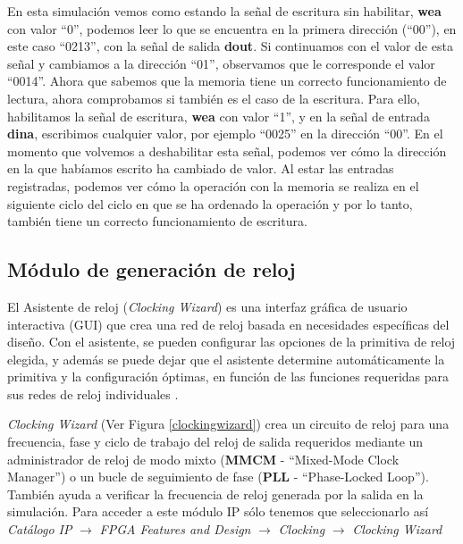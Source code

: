 En esta simulación vemos como estando la señal de escritura sin habilitar, \textbf{wea} con valor ``0'', podemos leer lo que se encuentra en la primera 
dirección (``00''), en este caso ``0213'', con la señal de salida \textbf{dout}. Si continuamos con el valor de esta señal y cambiamos a la dirección ``01'', observamos que le 
corresponde el valor ``0014''. Ahora que sabemos que la memoria tiene un correcto funcionamiento de lectura, ahora comprobamos si también es el caso de la escritura. 
Para ello, habilitamos la señal de escritura, \textbf{wea} con valor ``1'', y en la señal de entrada \textbf{dina}, escribimos cualquier valor, por ejemplo ``0025'' 
en la dirección ``00''. En el momento que volvemos a deshabilitar esta señal, podemos ver cómo la dirección en la que habíamos escrito ha cambiado de valor. Al estar 
las entradas registradas, podemos ver cómo la operación con la memoria se realiza en el siguiente ciclo del ciclo en que se ha ordenado la operación y por lo tanto, 
también tiene un correcto funcionamiento de escritura.

\subsection{Módulo de generación de reloj}

El Asistente de reloj (\textit{Clocking Wizard}) es una interfaz gráfica de usuario interactiva (GUI) que crea una 
red de reloj basada en necesidades específicas del diseño. Con el asistente, se pueden configurar las opciones de la 
primitiva de reloj elegida, y además se puede dejar que el asistente determine automáticamente la primitiva 
y la configuración óptimas, en función de las funciones requeridas para sus redes de reloj individuales \cite{pll}.

\textit{Clocking Wizard} (Ver Figura \ref{clockingwizard}) crea un circuito de reloj para una frecuencia, fase y ciclo de trabajo del reloj de salida 
requeridos mediante un administrador de reloj de modo mixto (\textbf{MMCM} - ``Mixed-Mode Clock Manager'') o un bucle de seguimiento de fase 
(\textbf{PLL} - ``Phase-Locked Loop''). También ayuda a verificar la frecuencia de reloj generada por la salida en la simulación.
Para acceder a este módulo IP sólo tenemos que seleccionarlo así \textit{Catálogo IP} $\rightarrow$ \textit{FPGA Features and Design} $\rightarrow$ \textit{Clocking} 
$\rightarrow$ \textit{Clocking Wizard}

